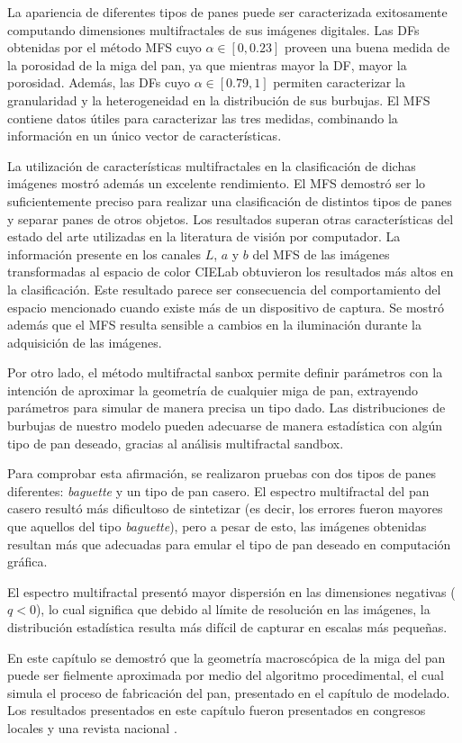 La apariencia de diferentes tipos de panes puede ser caracterizada exitosamente computando dimensiones multifractales de sus imágenes digitales.
Las DFs obtenidas por el método MFS cuyo $\alpha \in [0,0.23]$ proveen una buena medida de la porosidad de la miga del pan, ya que mientras mayor la DF, mayor la porosidad.
Además, las DFs cuyo $\alpha \in [0.79,1]$ permiten caracterizar la granularidad y la heterogeneidad en la distribución de sus burbujas.
El MFS contiene datos útiles para caracterizar las tres medidas, combinando la información en un único vector de características.

La utilización de características multifractales en la clasificación de dichas imágenes mostró además un excelente rendimiento.
El MFS demostró ser lo suficientemente preciso para realizar una clasificación de distintos tipos de panes y separar panes de otros objetos.
Los resultados superan otras características del estado del arte utilizadas en la literatura de visión por computador.
La información presente en los canales $L$, $a$ y $b$ del MFS de las imágenes transformadas al espacio de color CIELab obtuvieron los resultados más altos en la clasificación.
Este resultado parece ser consecuencia del comportamiento del espacio mencionado cuando existe más de un dispositivo de captura.
Se mostró además que el MFS resulta sensible a cambios en la iluminación durante la adquisición de las imágenes.

Por otro lado, el método multifractal sanbox permite definir parámetros con la intención de aproximar la geometría de cualquier miga de pan, extrayendo parámetros para simular de manera precisa un tipo dado.
Las distribuciones de burbujas de nuestro modelo pueden adecuarse de manera estadística con algún tipo de pan deseado, gracias al análisis multifractal sandbox.

Para comprobar esta afirmación, se realizaron pruebas con dos tipos de panes diferentes: {\em baguette} y un tipo de pan casero.
El espectro multifractal del pan casero resultó más dificultoso de sintetizar (es decir, los errores fueron mayores que aquellos del tipo {\em baguette}), pero a pesar de esto, las imágenes obtenidas resultan más que adecuadas para emular el tipo de pan deseado en computación gráfica.

El espectro multifractal presentó mayor dispersión en las dimensiones negativas ($q < 0$), 
lo cual significa que debido al límite de resolución en las imágenes, la distribución estadística resulta más difícil de capturar en escalas más pequeñas.

En este capítulo se demostró que la geometría macroscópica de la miga del pan puede ser fielmente aproximada por medio del algoritmo procedimental, el cual simula el proceso de fabricación del pan, presentado en el capítulo de modelado.
Los resultados presentados en este capítulo fueron presentados en congresos locales y una revista nacional \cite{Baravalle2012, Baravalle2012_2, Baravalle2012_3}.



